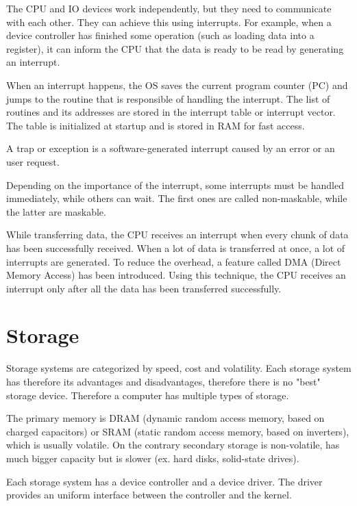 
The CPU and IO devices work independently, but they need to communicate with
each other. They can achieve this using interrupts. For example, when a device
controller has finished some operation (such as loading data into a register),
it can inform the CPU that the data is ready to be read by generating an
interrupt.


When an interrupt happens, the OS saves the current program counter (PC) and jumps to the routine that is responsible of handling the interrupt. The list of routines and its addresses are stored in the interrupt table or interrupt vector. The table is initialized at startup and is stored in RAM for fast access.

A trap or exception is a software-generated interrupt caused by an error or an user request.

Depending on the importance of the interrupt, some interrupts must be handled immediately, while others can wait. The first ones are called non-maskable, while the latter are maskable.

While transferring data, the CPU receives an interrupt when every chunk of data has been successfully received. When a lot of data is transferred at once, a lot of interrupts are generated. To reduce the overhead, a feature called DMA (Direct Memory Access) has been introduced. Using this technique, the CPU receives an interrupt only after all the data has been transferred successfully.

\section{Storage}

Storage systems are categorized by speed, cost and volatility. Each storage system has therefore its advantages and disadvantages, therefore there is no "best" storage device. Therefore a computer has multiple types of storage.

The primary memory is DRAM (dynamic random access memory, based on charged capacitors) or SRAM (static random access memory, based on inverters), which is usually volatile. On the contrary secondary storage is non-volatile, has much bigger capacity but is slower (ex. hard disks, solid-state drives).

Each storage system has a device controller and a device driver. The driver provides an uniform interface between the controller and the kernel.

